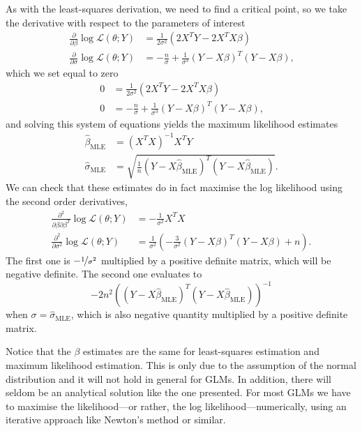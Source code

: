 \documentclass[a4paper]{article}
\begin{document}
As with the least-squares derivation, we need to find a critical point, so we take the derivative with respect to the parameters of interest
\begin{align*}
 \frac{\partial}{\partial\beta}
\log\mathcal{L}(\theta;Y)
 &=
  \frac{1}{2 \sigma^2}
(  2 X^T Y -
    2X^T X \beta )
    \\
 \frac{\partial}{\partial\sigma}
\log\mathcal{L}(\theta;Y)
 &=
-\frac{n}{\sigma}
+  \frac{1}{\sigma^3}
   (Y-X\beta)^T (Y-X\beta)
   \text{,}
\end{align*}
which we set equal to zero
\begin{align*}
0
 &=
  \frac{1}{2 \sigma^2}
(  2 X^T Y -
    2X^T X \beta )
    \\
0
 &=
-\frac{n}{\sigma}
+  \frac{1}{\sigma^3}
   (Y-X\beta)^T (Y-X\beta)
   \text{,}
\end{align*}
and solving this system of equations yields the maximum likelihood estimates
\begin{align*}
\hat{\beta}_{\text{MLE}} &= (X^T X)^{-1} X^T Y
    \\
\hat{\sigma}_{\text{MLE}}
 &=
\sqrt{
\frac{1}{n}
   (Y-X\hat{\beta}_{\text{MLE}})^T (Y-X\hat{\beta}_{\text{MLE}})
   }
   \text{.}
\end{align*}
We can check that these estimates do in fact maximise the log likelihood using the second order derivatives,
\begin{align*}
 \frac{\partial^2}{\partial\beta \partial\beta^T}
 \log\mathcal{L}(\theta;Y)
 &=
 - \frac{1}{ \sigma^2} X^T X
 \\
 \frac{\partial^2}{\partial\sigma^2}
\log\mathcal{L}(\theta;Y)
 &=
\frac{1}{\sigma^2}
\left(
 -\frac{3}{\sigma^2}
   (Y-X\beta)^T (Y-X\beta)
   + n
\right)
   \text{.}
\end{align*}
The first one is
$ -\nicefrac{1}{ \sigma^2}$ multiplied by a positive definite matrix, which will be negative definite.
The second one evaluates to
\[
-2n^2
\left(
  (Y-X\hat{\beta}_{\text{MLE}})^T
  (Y-X\hat{\beta}_{\text{MLE}})
\right)^{-1}
\]
when $\sigma = \hat{\sigma}_{\text{MLE}}$, which is also negative quantity multiplied by a positive definite matrix.


Notice that the $\beta$ estimates are the same for least-squares estimation and maximum likelihood estimation.
This is only due to the assumption of the normal distribution and it will not hold in general for GLMs.
In addition, there will seldom be an analytical solution like the one presented.
For most GLMs we have to maximise the likelihood---or rather, the log likelihood---numerically, using an iterative approach like Newton's method or similar.
\end{document}
